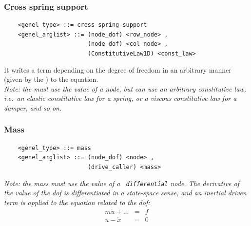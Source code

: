 \subsubsection{Cross spring support}
\begin{verbatim}
    <genel_type> ::= cross spring support
    <genel_arglist> ::= (node_dof) <row_node> ,                      
                        (node_dof) <col_node> ,                      
                        (ConstitutiveLaw1D) <const_law>
\end{verbatim}
It writes a term depending on the  degree of freedom in an
arbitrary manner (given by the ) to the 
 equation. \\
{\em
    Note: the  must use the  value
    of a  node, but can use an arbitrary constitutive law,
    i.e.\ an elastic constitutive law for a spring, or a viscous
    constitutive law for a damper, and so on.
}

\subsubsection{Mass}
\begin{verbatim}
    <genel_type> ::= mass
    <genel_arglist> ::= (node_dof) <node> ,                     
                        (drive_caller) <mass>
\end{verbatim}
{\em
    Note: the mass must use the  value of a {\tt
    differential} node. The derivative of the  value of
    the dof is differentiated in a state-space sense, and an inertial driven
    term is applied to the equation related to the dof:
    \begin{eqnarray*}
        m\dot{u} + \ldots & = & f \\
	u - \dot{x} & = & 0
    \end{eqnarray*}
}


